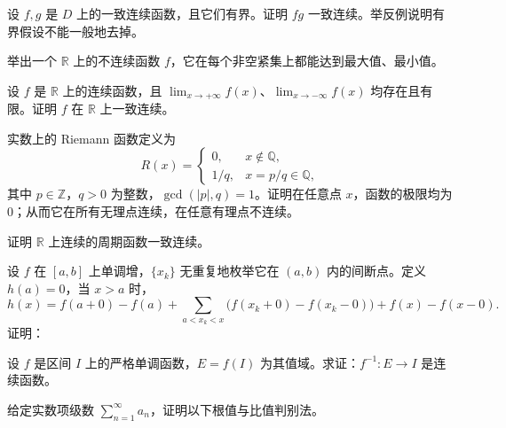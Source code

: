 \newpage
\noindent\begin{minipage}{\textwidth}
设 $f,g$ 是 $D$ 上的一致连续函数，且它们有界。证明 $fg$ 一致连续。举反例说明有界假设不能一般地去掉。
\end{minipage}\par\vfill
\noindent\begin{minipage}{\textwidth}
举出一个 $\mathbb R$ 上的不连续函数 $f$，它在每个非空紧集上都能达到最大值、最小值。
\end{minipage}\par\vfill
\noindent\begin{minipage}{\textwidth}
设 $f$ 是 $\mathbb R$ 上的连续函数，且 $\lim_{x\to+\infty}f(x)$、$\lim_{x\to-\infty}f(x)$ 均存在且有限。证明 $f$ 在 $\mathbb R$ 上一致连续。
\end{minipage}\par\vfill
\noindent\begin{minipage}{\textwidth}
实数上的 Riemann 函数定义为\[R(x)=\begin{cases}0,&x\notin\mathbb Q,\\1/q,&x=p/q\in\mathbb Q,\end{cases}\]其中 $p\in\mathbb Z$，$q>0$ 为整数，$\gcd(|p|,q)=1$。证明在任意点 $x$，函数的极限均为 $0$；从而它在所有无理点连续，在任意有理点不连续。
\end{minipage}\par\vfill
\newpage
\noindent\begin{minipage}{\textwidth}
证明 $\mathbb R$ 上连续的周期函数一致连续。
\end{minipage}\par\vfill
\noindent\begin{minipage}{\textwidth}
设 $f$ 在 $[a,b]$ 上单调增，$\{x_k\}$ 无重复地枚举它在 $(a,b)$ 内的间断点。定义 $h(a)=0$，当 $x>a$ 时，\[h(x)=f(a+0)-f(a)+\sum_{a<x_k<x}\bigl(f(x_k+0)-f(x_k-0)\bigr)+f(x)-f(x-0).\]证明：
\end{minipage}\par\vfill
\noindent\begin{minipage}{\textwidth}
设 $f$ 是区间 $I$ 上的严格单调函数，$E=f(I)$ 为其值域。求证：$f^{-1}:E\to I$ 是连续函数。
\end{minipage}\par\vfill
\noindent\begin{minipage}{\textwidth}
给定实数项级数 $\sum_{n=1}^{\infty}a_n$，证明以下根值与比值判别法。
\end{minipage}\par\vfill
